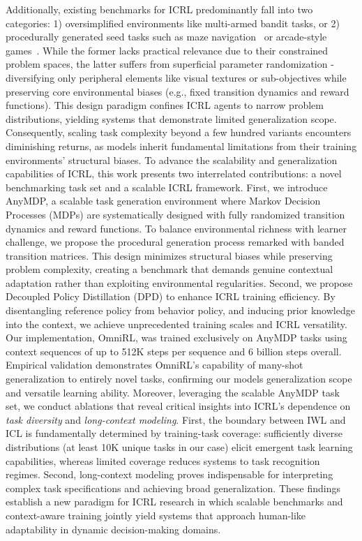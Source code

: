 \documentclass{article}
\renewcommand{\cite}[1]{\citep{#1}}
\begin{document}
Additionally, existing benchmarks for ICRL predominantly fall into two categories: 1) oversimplified environments like multi-armed bandit tasks, or 2) procedurally generated seed tasks such as maze navigation~\cite{wang2022evolving, nikulin2023xland, morad2023popgym} or arcade-style games~\cite{cobbe2020leveraging}. While the former lacks practical relevance due to their constrained problem spaces, the latter suffers from superficial parameter randomization - diversifying only peripheral elements like visual textures or sub-objectives while preserving core environmental biases (e.g., fixed transition dynamics and reward functions). This design paradigm confines ICRL agents to narrow problem distributions, yielding systems that demonstrate limited generalization scope. Consequently, scaling task complexity beyond a few hundred variants encounters diminishing returns, as models inherit fundamental limitations from their training environments' structural biases.
To advance the scalability and generalization capabilities of ICRL, this work presents two interrelated contributions: a novel benchmarking task set and a scalable ICRL framework. First, we introduce AnyMDP, a scalable task generation environment where Markov Decision Processes (MDPs) are systematically designed with fully randomized transition dynamics and reward functions. To balance environmental richness with learner challenge, we propose the procedural generation process remarked with banded transition matrices. This design minimizes structural biases while preserving problem complexity, creating a benchmark that demands genuine contextual adaptation rather than exploiting environmental regularities. Second, we propose Decoupled Policy Distillation (DPD) to enhance ICRL training efficiency. By disentangling reference policy from behavior policy, and inducing prior knowledge into the context, we achieve unprecedented training scales and ICRL versatility. Our implementation, OmniRL, was trained exclusively on AnyMDP tasks using context sequences of up to 512K steps per sequence and 6 billion steps overall. Empirical validation demonstrates OmniRL's capability of many-shot generalization to entirely novel tasks, confirming our models generalization scope and versatile learning ability.
Moreover, leveraging the scalable AnyMDP task set, we conduct ablations that reveal critical insights into ICRL’s dependence on \emph{task diversity} and \emph{long-context modeling}.
First, the boundary between IWL and ICL is fundamentally determined by training-task coverage: sufficiently diverse distributions (at least 10K unique tasks in our case) elicit emergent task learning capabilities, whereas limited coverage reduces systems to task recognition regimes.
Second, long-context modeling proves indispensable for interpreting complex task specifications and achieving broad generalization.
These findings establish a new paradigm for ICRL research in which scalable benchmarks and context-aware training jointly yield systems that approach human-like adaptability in dynamic decision-making domains.
\end{document}

